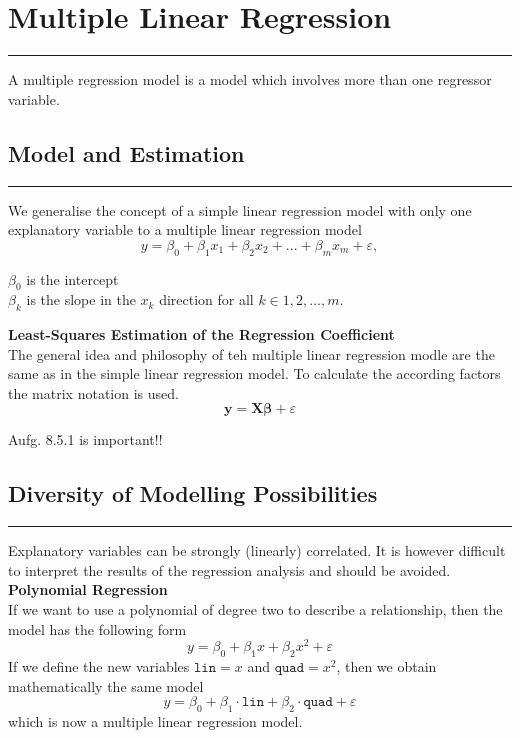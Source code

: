 \section{Multiple Linear Regression}
\noindent\rule[\linienAbstand]{\linewidth}{\linienDickeDick}
A multiple regression model is a model which involves more than one regressor variable.\\

\subsection{Model and Estimation}
\noindent\rule[\linienAbstand]{\linewidth}{\linienDicke}
We generalise the concept of a simple linear regression model with only one explanatory variable to a multiple linear regression model
\begin{equation}
  y = \beta_0 + \beta_1 x_1 + \beta_2 x_2 + ... + \beta_m x_m +\varepsilon,
\end{equation}

$\beta_0$ is the intercept\\
$\beta_k$ is the slope in the $x_k$ direction for all $k \in {1, 2, ..., m}$.


\textbf{Least-Squares Estimation of the Regression Coefficient}\\
The general idea and philosophy of teh multiple linear regression modle are the same as in the simple linear regression model. To calculate the according factors the matrix notation is used.
\begin{equation}
  \mathbf{y} = \mathbf{X} \mathbf{\beta} + \varepsilon
\end{equation}

Aufg. 8.5.1 is important!!

\subsection{Diversity of Modelling Possibilities}
\noindent\rule[\linienAbstand]{\linewidth}{\linienDicke}
Explanatory variables can be strongly (linearly) correlated. It is however difficult to interpret the results of the regression analysis and should be avoided.\\

\textbf{Polynomial Regression}\\
If we want to use a polynomial of degree two to describe a relationship, then the model has the following form
\begin{equation}
  y = \beta_0 + \beta_1x + \beta_2 x^2 + \varepsilon
\end{equation}
If we define the new variables $\texttt{lin} = x$ and $\texttt{quad} = x^2$, then we obtain mathematically the same model
\begin{equation}
  y = \beta_0 + \beta_1 \cdot \texttt{lin} + \beta_2 \cdot \texttt{quad} + \varepsilon
\end{equation}
which is now a multiple linear regression model.\\

